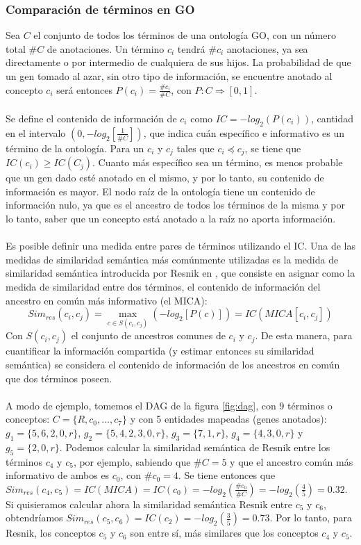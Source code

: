 \subsubsection{Comparación de términos en GO}
Sea $C$ el conjunto de todos los términos de una ontología GO, con un número total $\#C$ de anotaciones. Un término $c_i$ tendrá $\#c_i$ anotaciones, ya sea directamente o por intermedio de cualquiera de sus hijos. La probabilidad de que un gen tomado al azar, sin otro tipo de información, se encuentre anotado al concepto $c_i$ será entonces $P(c_i) = \frac{\#c_i}{\#C}$, con $P:C\Rightarrow [0,1]$.\\\\
Se define el contenido de información de $c_i$ como $IC = -log_2(P(c_i))$, cantidad en el intervalo $(0, -log_2[\frac{1}{\#C}])$, que indica cuán específico e informativo es un término de la ontología. Para un $c_i$ y $c_j$ tales que $c_i \preceq c_j$, se tiene que $IC(c_i) \geq IC(C_j)$. Cuanto más específico sea un término, es menos probable que un gen dado esté anotado en el mismo, y por lo tanto, su contenido de información es mayor. El nodo raíz de la ontología tiene un contenido de información nulo, ya que es el ancestro de todos los términos de la misma y por lo tanto, saber que un concepto está anotado a la raíz no aporta información.\\\\
Es posible definir una medida entre pares de términos utilizando el IC. Una de las medidas de similaridad semántica más comúnmente utilizadas es la medida de similaridad semántica introducida por Resnik en \cite{Resnik1995}, que consiste en asignar como la medida de similaridad entre dos términos, el contenido de información del ancestro en común más informativo (el MICA):
\begin{equation}
	Sim_{res}(c_i, c_j) = \max\limits_{c \in S(c_i, c_j)}(-log_2[P(c)]) = IC(MICA[c_i, c_j])
\end{equation}
Con $S(c_i, c_j)$ el conjunto de ancestros comunes de $c_i$ y $c_j$. De esta manera, para cuantificar la información compartida (y estimar entonces su similaridad semántica) se considera el contenido de información de los ancestros en común que dos términos poseen.\\\\
A modo de ejemplo, tomemos el DAG de la figura \ref{fig:dag}, con 9 términos o conceptos: $C=\{R, c_0,...,c_7\}$ y con 5 entidades mapeadas (genes anotados): $g_1=\{5, 6, 2, 0, r\}$, $g_2=\{5, 4, 2, 3, 0, r\}$, $g_3=\{7, 1, r\}$, $g_4=\{4, 3, 0, r\}$ y $g_5=\{2, 0, r\}$. Podemos calcular la similaridad semántica de Resnik entre los términos $c_4$ y $c_5$, por ejemplo, sabiendo que $\#C = 5$ y que el ancestro común más informativo de ambos es $c_0$, con $\#c_0=4$. Se tiene entonces que $Sim_{res}(c_4, c_5) = IC(MICA) = IC(c_0) = -log_2(\frac{\#c_0}{\#C}) = -log_2(\frac{4}{5}) = 0.32$. Si quisieramos calcular ahora la similaridad semántica Resnik entre $c_5$ y $c_6$, obtendríamos $Sim_{res}(c_5, c_6) = IC(c_2) = -log_2(\frac{3}{5}) = 0.73$. Por lo tanto, para Resnik, los conceptos $c_5$ y $c_6$ son entre sí, más similares que los conceptos $c_4$ y $c_5$.\\\\
